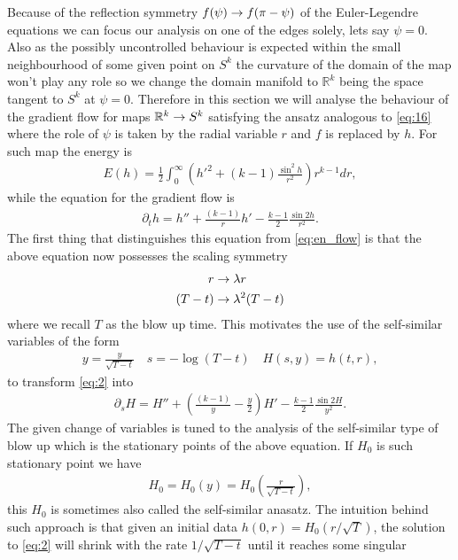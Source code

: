 Because of the reflection symmetry $f(\psi)\rightarrow f(\pi-\psi)$ of the
Euler-Legendre equations we can focus our analysis on one of the edges
solely, lets say $\psi=0$. Also as the possibly uncontrolled behaviour
is expected within the small neighbourhood of some given point on
$S^k$ the curvature of the domain of the map won't play any role so we
change the domain manifold to $\mathbb{R}^k$ being the space tangent
to $S^k$ at $\psi=0$. Therefore in this section we will analyse the
behaviour of the gradient flow for maps $\mathbb{R}^k\rightarrow S^k$
satisfying the ansatz analogous to \eqref{eq:16} where the role of
$\psi$ is taken by the radial variable $r$ and $f$ is replaced by $h$.
For such map the energy is
\begin{align}
  \label{eq:51}
  E(h)=\frac{1}{2}\int_0^\infty \left(h'^2+(k-1)\frac{\sin^2 h}{r^2}\right)r^{k-1}dr,
\end{align}
while the equation for the gradient flow is
\begin{align}
  \label{eq:2}
  \partial_t
  h=h''+\frac{(k-1)}{r}h'-\frac{k-1}{2}\frac{\sin2h}{r^2}.
\end{align}
The first thing that distinguishes this equation from
\eqref{eq:en_flow} is that the above equation now possesses the
scaling symmetry
\begin{align}
  \label{eq:6}
  r&\rightarrow\lambda r \\
  (T-t)&\rightarrow\lambda^2(T-t)
\end{align}
where we recall $T$ as the blow up time. This motivates the use of the
self-similar variables of the form
\begin{align}
  \label{eq:3}
  y=\frac{y}{\sqrt{T-t}}\quad s=-\log(T-t)\quad H(s,y)=h(t,r),
\end{align}
to transform \eqref{eq:2} into
\begin{align}
  \label{eq:4}
  \partial_s
  H=H''+\left(\frac{(k-1)}{y}-\frac{y}{2}\right)H'-\frac{k-1}{2}\frac{\sin2H}{y^2}.
\end{align}
The given change of variables is tuned to the analysis of the
self-similar type of blow up which is the stationary points of the
above equation. If $H_0$ is such stationary point we have
\begin{align}
  \label{eq:5}
  H_0=H_0(y)=H_0\left(\frac{r}{\sqrt{T-t}}\right),
\end{align}
this $H_0$ is sometimes also called the self-similar anasatz. The
intuition behind such approach is that given an initial data
$h(0,r)=H_0(r/\sqrt{T})$, the solution to \eqref{eq:2} will
shrink with the rate $1/\sqrt{T-t}$ until it reaches some singular
